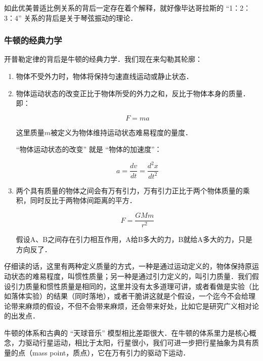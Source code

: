 如此优美普适比例关系的背后一定存在着个解释，就好像毕达哥拉斯的 “1：2：3：4” 关系的背后是关于琴弦振动的理论．

\subsubsection{牛顿的经典力学}

开普勒定律的背后是牛顿的经典力学．我们现在来勾勒其轮廓：

\begin{enumerate}
\item 

物体不受外力时，物体将保持匀速直线运动或静止状态．

\item

物体运动状态的改变正比于物体所受的外力之和，反比于物体本身的质量．即：

\begin{equation}
F = ma
\end{equation}

这里质量$m$被定义为物体维持运动状态难易程度的量度．

“物体运动状态的改变” 就是 “物体的加速度”：

\begin{equation}
a = \frac{d v}{d t} = \frac{d^2 x}{d t^2}
\end{equation}

\item

两个具有质量的物体之间会有万有引力，万有引力正比于两个物体质量的乘积，同时反比于两物体间距离的平方．

\begin{equation}
F = \frac{G M m}{r^2}
\end{equation}

假设A、B之间存在引力相互作用，A给B多大的力，B就给A多大的力，只是方向反了．

\end{enumerate}

仔细读的话，这里有两种定义质量的方式，一种是通过运动定义的，物体保持原运动状态的难易程度，叫惯性质量；另一种是通过引力定义的，叫引力质量．我们假设引力质量和惯性质量是相同的，这里并没有太多道理可讲，或者看做是实验（比如落体实验）的结果（同时落地），或者干脆讲这就是个假设，一个迄今不会给理论带来麻烦的假设，不但不会带来麻烦，还会带来好处，比如它是研究广义相对论的出发点．

牛顿的体系和古典的 “天球音乐” 模型相比差距很大．在牛顿的体系里力是核心概念，力驱动行星运动，相比于太阳，行星很小，我们可进一步把行星抽象为具有质量的点（mass point，质点），它在万有引力的驱动下运动．

